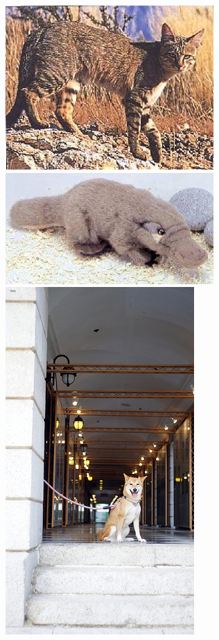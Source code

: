 \documentclass[12pt]{article}
\begin{document}
\begin{figure}[H]
    \centering
{\includegraphics[scale=0.5]{../no-dogs/eval/96.jpg}
  \includegraphics[scale=0.5]{../no-dogs/eval/157.jpg}}
{\includegraphics[scale=1.5]{../dogs/eval/122.jpg}
}
\end{figure}
\end{document}
